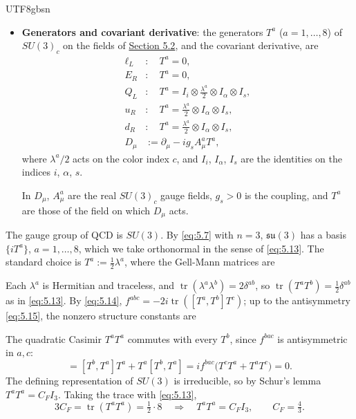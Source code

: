\documentclass[11pt,a4paper,oneside]{report}
\begin{document}
\begin{CJK*}{UTF8}{gbsn}
\begin{itemize}
\item \textbf{\boldmath Generators and covariant derivative}: the generators $T^a$ ($a=1,\ldots,8$) of $SU(3)_c$ on the fields of \hyperref[sm-fermions]{Section 5.2}, and the covariant derivative, are
\begin{equation*}
\begin{aligned}
\ell_L&:\quad T^a=0,\\
E_R&:\quad T^a=0,\\
Q_L&:\quad T^a=I_i\otimes\frac{\lambda^a}{2}\otimes I_\alpha\otimes I_s,\\
u_R&:\quad T^a=\frac{\lambda^a}{2}\otimes I_\alpha\otimes I_s,\\
d_R&:\quad T^a=\frac{\lambda^a}{2}\otimes I_\alpha\otimes I_s,\\[6pt]
D_\mu&:=\partial_\mu-ig_sA_\mu^aT^a,
\end{aligned}
\tag{5.70}\label{eq:5.70}
\end{equation*}
where $\lambda^a/2$ acts on the color index $c$, and $I_i$, $I_\alpha$, $I_s$ are the identities on the indices $i$, $\alpha$, $s$.

In $D_\mu$, $A_\mu^a$ are the real $SU(3)_c$ gauge fields, $g_s>0$ is the coupling, and $T^a$ are those of the field on which $D_\mu$ acts.
\end{itemize}


The gauge group of QCD is $SU(3)$. By \eqref{eq:5.7} with $n=3$, $\mathfrak{su}(3)$ has a basis $\{iT^a\}$, $a=1,\ldots,8$, which we take orthonormal in the sense of \eqref{eq:5.13}. The standard choice is $T^a:=\tfrac12\lambda^a$, where the Gell-Mann matrices are

Each $\lambda^a$ is Hermitian and traceless, and $\operatorname{tr}(\lambda^a\lambda^b)=2\delta^{ab}$, so $\operatorname{tr}(T^aT^b)=\tfrac12\delta^{ab}$ as in \eqref{eq:5.13}. By \eqref{eq:5.14}, $f^{abc}=-2i\operatorname{tr}([T^a,T^b]T^c)$; up to the antisymmetry \eqref{eq:5.15}, the nonzero structure constants are

The quadratic Casimir $T^aT^a$ commutes with every $T^b$, since $f^{bac}$ is antisymmetric in $a,c$:
\begin{equation*}
[T^b,T^aT^a]=[T^b,T^a]T^a+T^a[T^b,T^a]=if^{bac}\bigl(T^cT^a+T^aT^c\bigr)=0.
\tag{5.71}\label{eq:5.71}
\end{equation*}
The defining representation of $SU(3)$ is irreducible, so by Schur's lemma $T^aT^a=C_FI_3$. Taking the trace with \eqref{eq:5.13},
\begin{equation*}
3C_F=\operatorname{tr}(T^aT^a)=\tfrac12\cdot8
\quad\Longrightarrow\quad
{\displaystyle T^aT^a=C_FI_3,\qquad C_F=\tfrac43.}
\tag{5.72}\label{eq:5.72}
\end{equation*}


\end{CJK*}
\end{document}

